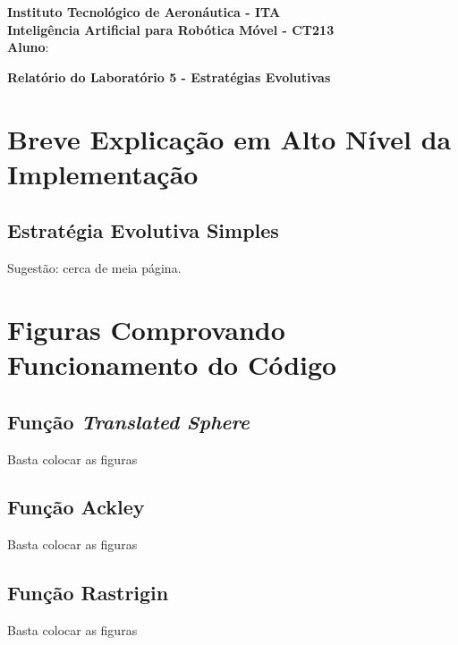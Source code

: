 \documentclass[brazil, 12pt]{article}
\begin{document}
\begin{center}
\textbf{Instituto Tecnológico de Aeronáutica - ITA} \\
\textbf{Inteligência Artificial para Robótica Móvel - CT213} \\
\textbf{Aluno}:     %
\end{center}

\begin{center}
\textbf{Relatório do Laboratório 5 - Estratégias Evolutivas}
\end{center}
\vspace*{0.5cm}

\section{Breve Explicação em Alto Nível da Implementação}

\subsection{Estratégia Evolutiva Simples}
Sugestão: cerca de meia página.


\section{Figuras Comprovando Funcionamento do Código}

\subsection{Função \emph{Translated Sphere}}
Basta colocar as figuras

\subsection{Função Ackley}
Basta colocar as figuras

\subsection{Função Rastrigin}
Basta colocar as figuras
\end{document}
